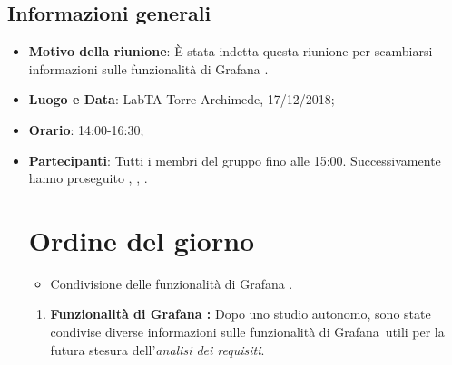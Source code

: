 \documentclass[12pt]{article}
\begin{document}
    \subsection{Informazioni generali}
    \begin{itemize}
        \item \textbf{Motivo della riunione}: È stata indetta questa riunione per scambiarsi informazioni sulle funzionalità di Grafana   \pedice.
        \item \textbf{Luogo e Data}: LabTA Torre Archimede, 17/12/2018;
        \item \textbf{Orario}: 14:00-16:30;
        \item \textbf{Partecipanti}: Tutti i membri del gruppo fino alle 15:00. Successivamente hanno proseguito \daL, \daG, \mat.
        \newpage
        \section{Ordine del giorno}
        \begin{itemize}
        \item Condivisione delle funzionalità di Grafana \pedice .
        \end{itemize}
        
        \newpage
    \begin{enumerate}
    \section{Resoconto}
        \item \textbf{Funzionalità di Grafana \pedice:} Dopo uno studio autonomo, sono state condivise diverse informazioni sulle funzionalità di Grafana~\pedice utili per la futura stesura dell'\textit{analisi dei requisiti}.
    \end{enumerate}

    \end{itemize}
\end{document}
